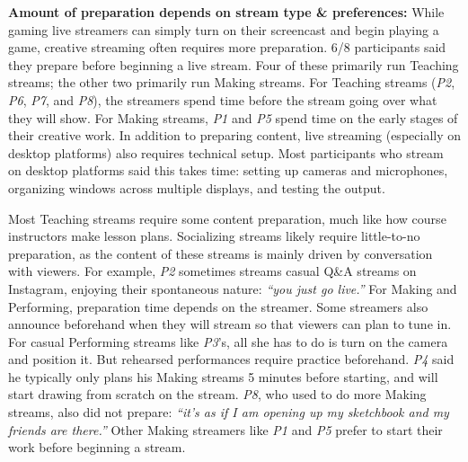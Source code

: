 \textbf{Amount of preparation depends on stream type \& preferences:}
While gaming live streamers can simply turn on their screencast and begin playing a game, creative streaming often requires more preparation. 6/8 participants said they prepare before beginning a live stream. Four of these primarily run Teaching streams; the other two primarily run Making streams. For Teaching streams (\textit{P2}, \textit{P6}, \textit{P7}, and \textit{P8}), the streamers spend time before the stream going over what they will show. For Making streams, \textit{P1} and \textit{P5} spend time on the early stages of their creative work. In addition to preparing content, live streaming (especially on desktop platforms) also requires technical setup. Most participants who stream on desktop platforms said this takes time: setting up cameras and microphones, organizing windows across multiple displays, and testing the output.

Most Teaching streams require some content preparation, much like how course instructors make lesson plans. Socializing streams likely require little-to-no preparation, as the content of these streams is mainly driven by conversation with viewers. For example, \textit{P2} sometimes streams casual Q\&A streams on Instagram, enjoying their spontaneous nature: \textit{``you just go live.''} For Making and Performing, preparation time depends on the streamer. Some streamers also announce beforehand when they will stream so that viewers can plan to tune in.
For casual Performing streams like \textit{P3}'s, all she has to do is turn on the camera and position it. But rehearsed performances require practice beforehand. \textit{P4} said he typically only plans his Making streams 5 minutes before starting, and will start drawing from scratch on the stream. \textit{P8}, who used to do more Making streams, also did not prepare: \textit{``it's as if I am opening up my sketchbook and my friends are there.''} Other Making streamers like \textit{P1} and \textit{P5} prefer to start their work before beginning a stream.

